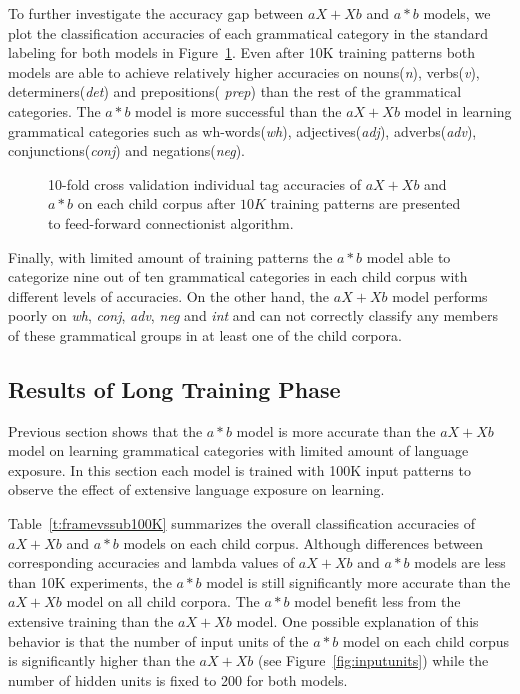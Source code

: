 To further investigate the accuracy gap between $aX+Xb$ and $a*b$ models, we
plot the classification accuracies of each grammatical category in the standard
labeling for both models in Figure~\ref{fig:category10K}.  Even after 10K
training patterns both models are able to achieve relatively higher accuracies
on nouns({\it n}), verbs({\it v}), determiners({\it det}) and prepositions({\it
prep}) than the rest of the grammatical categories.  The $a*b$ model is more
successful than the $aX+Xb$ model in learning grammatical categories such as
wh-words({\it wh}), adjectives({\it adj}), adverbs({\it adv}),
conjunctions({\it conj}) and negations({\it neg}). 

\begin{figure}[h]
 \caption{10-fold cross validation individual tag accuracies of $aX+Xb$ and
  $a*b$ on each child corpus after $10K$ training patterns are presented to
  feed-forward connectionist algorithm.  }
  \label{fig:category10K}
\end{figure}

Finally, with limited amount of training patterns the $a*b$ model able to
categorize nine out of ten grammatical categories in each child corpus with
different levels of accuracies.  On the other hand, the $aX+Xb$ model performs
poorly on {\it wh}, {\it conj}, {\it adv}, {\it neg} and {\it int} and can not
correctly classify any members of these grammatical groups in at least one of
the child corpora.

\subsection{Results of Long Training Phase} 

Previous section shows that the $a*b$ model is more accurate than the $aX+Xb$
model on learning grammatical categories with limited amount of language
exposure.  In this section each model is trained with 100K input patterns to
observe the effect of extensive language exposure on learning.


Table~\ref{t:framevssub100K} summarizes the overall classification accuracies
of $aX+Xb$ and $a*b$ models on each child corpus.  Although differences between
corresponding accuracies and lambda values of $aX+Xb$ and $a*b$ models are less
than 10K experiments, the $a*b$ model is still significantly more accurate than
the $aX+Xb$ model on all child corpora.  The $a*b$ model benefit less from the
extensive training than the $aX+Xb$ model. One possible explanation of this
behavior is that the number of input units of the $a*b$ model on each child
corpus is significantly higher than the $aX+Xb$ (see
Figure~\ref{fig:inputunits}) while the number of hidden units is fixed to 200
for both models. 

